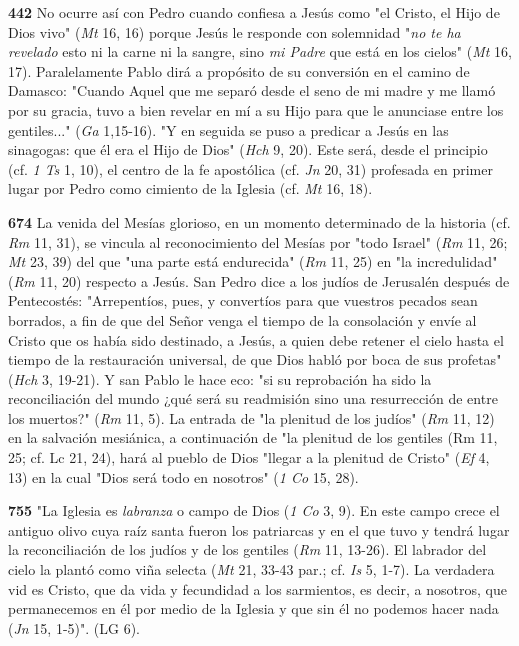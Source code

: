 \documentclass[]{article}
\begin{document}
\textbf{442} No ocurre así con Pedro cuando confiesa a Jesús como "el
Cristo, el Hijo de Dios vivo" (\emph{Mt} 16, 16) porque Jesús le
responde con solemnidad "\emph{no te ha revelado} esto ni la carne ni la
sangre, sino \emph{mi Padre} que está en los cielos" (\emph{Mt} 16, 17).
Paralelamente Pablo dirá a propósito de su conversión en el camino de
Damasco: "Cuando Aquel que me separó desde el seno de mi madre y me
llamó por su gracia, tuvo a bien revelar en mí a su Hijo para que le
anunciase entre los gentiles..." (\emph{Ga} 1,15-16). "Y en seguida se
puso a predicar a Jesús en las sinagogas: que él era el Hijo de Dios"
(\emph{Hch} 9, 20). Este será, desde el principio (cf. \emph{1 Ts} 1,
10), el centro de la fe apostólica (cf. \emph{Jn} 20, 31) profesada en
primer lugar por Pedro como cimiento de la Iglesia (cf. \emph{Mt} 16,
18).

\textbf{674} La venida del Mesías glorioso, en un momento determinado de
la historia (cf. \emph{Rm} 11, 31), se vincula al reconocimiento del
Mesías por "todo Israel" (\emph{Rm} 11, 26; \emph{Mt} 23, 39) del que
"una parte está endurecida" (\emph{Rm} 11, 25) en "la incredulidad"
(\emph{Rm} 11, 20) respecto a Jesús. San Pedro dice a los judíos de
Jerusalén después de Pentecostés: "Arrepentíos, pues, y convertíos para
que vuestros pecados sean borrados, a fin de que del Señor venga el
tiempo de la consolación y envíe al Cristo que os había sido destinado,
a Jesús, a quien debe retener el cielo hasta el tiempo de la
restauración universal, de que Dios habló por boca de sus profetas"
(\emph{Hch} 3, 19-21). Y san Pablo le hace eco: "si su reprobación ha
sido la reconciliación del mundo ¿qué será su readmisión sino una
resurrección de entre los muertos?" (\emph{Rm} 11, 5). La entrada de "la
plenitud de los judíos" (\emph{Rm} 11, 12) en la salvación mesiánica, a
continuación de "la plenitud de los gentiles (Rm 11, 25; cf. Lc 21, 24),
hará al pueblo de Dios "llegar a la plenitud de Cristo" (\emph{Ef} 4,
13) en la cual "Dios será todo en nosotros" (\emph{1 Co} 15, 28).

\textbf{755} "La Iglesia es \emph{labranza} o campo de Dios (\emph{1 Co}
3, 9). En este campo crece el antiguo olivo cuya raíz santa fueron los
patriarcas y en el que tuvo y tendrá lugar la reconciliación de los
judíos y de los gentiles (\emph{Rm} 11, 13-26). El labrador del cielo la
plantó como viña selecta (\emph{Mt} 21, 33-43 par.; cf. \emph{Is} 5,
1-7). La verdadera vid es Cristo, que da vida y fecundidad a los
sarmientos, es decir, a nosotros, que permanecemos en él por medio de la
Iglesia y que sin él no podemos hacer nada (\emph{Jn} 15, 1-5)". (LG 6).
\end{document}
